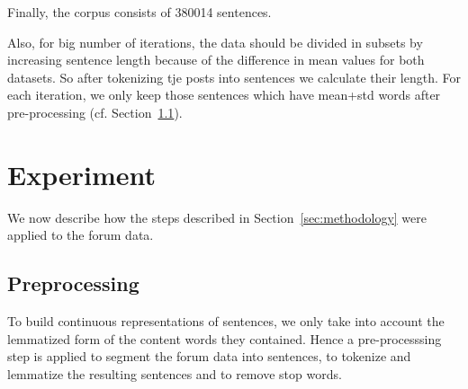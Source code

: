 \documentclass[11pt]{article}
\begin{document}
Finally, the corpus consists of 380014 sentences. 

Also, for big number of iterations, the data should be divided in
subsets by increasing sentence length because of the difference in
mean values for both datasets. So after tokenizing tje posts into
sentences we calculate their length. For each iteration, we only keep
those sentences which have mean+std words after pre-processing
(cf. Section~\ref{subsec:preprocessing}).


\section{Experiment}
\label{sec:xps}

We now describe how the steps described in Section~\ref{sec:methodology} were applied to the forum data.



\subsection{Preprocessing }
\label{subsec:preprocessing}

To build continuous representations of sentences, we only take into
account the lemmatized form of the content words they contained. Hence
a pre-processsing step is applied to segment the forum data into
sentences, to tokenize and lemmatize the resulting sentences and to
remove stop words.
\end{document}
